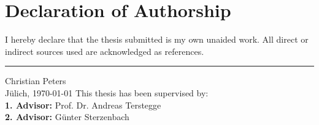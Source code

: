 \chapter*{Declaration of Authorship}
\thispagestyle{empty}
I hereby declare that the thesis submitted is my own unaided work. All
direct or indirect sources used are acknowledged as references.

\vspace{1.5cm}
{\hrule width 6cm} 
\vspace{1ex}
\noindent{}Christian Peters\\
J\"ulich, \today
\vfill
\noindent{}This thesis has been supervised by:\\
{\bfseries 1. Advisor:} Prof. Dr. Andreas Terstegge\\
{\bfseries 2. Advisor:} G\"unter Sterzenbach
